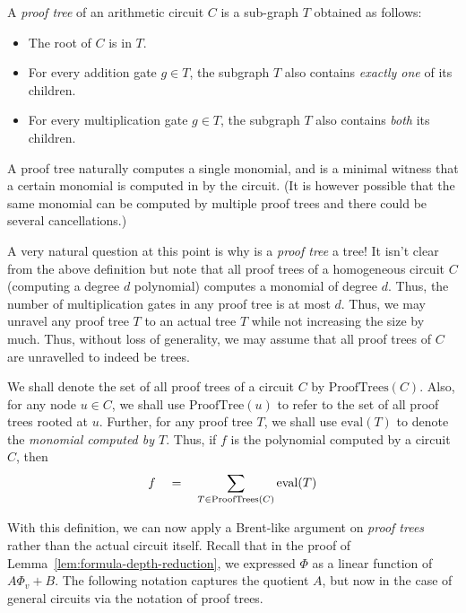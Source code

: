 \begin{definition}\label{defn:proof-tree}
A \emph{proof tree} of an arithmetic circuit $C$ is a sub-graph $T$ obtained as follows:
\begin{itemize}
\item The root of $C$ is in $T$.
\item For every addition gate $g\in T$, the subgraph $T$ also contains \emph{exactly one} of its children.
\item For every multiplication gate $g\in T$, the subgraph $T$ also contains \emph{both} its children. 
\end{itemize}
\end{definition}

A proof tree naturally computes a single monomial, and is a minimal witness that a certain monomial is computed in by the circuit. (It is however possible that the same monomial can be computed by multiple proof trees and there could be several cancellations.)

A very natural question at this point is why is a \emph{proof tree} a tree! It isn't clear from the above definition but note that all proof trees of a homogeneous circuit $C$ (computing a degree $d$ polynomial) computes a monomial of degree $d$. Thus, the number of multiplication gates in any proof tree is at most $d$. Thus, we may unravel any proof tree $T$ to an actual tree $T$ while not increasing the size by much. Thus, without loss of generality, we may assume that all proof trees of $C$ are unravelled to indeed be trees. 

We shall denote the set of all proof trees of a circuit $C$ by $\mathrm{ProofTrees}(C)$. Also, for any node $u\in C$, we shall use $\mathrm{ProofTree}(u)$ to refer to the set of all proof trees rooted at $u$. Further, for any proof tree $T$, we shall use $\mathrm{eval}(T)$ to denote  the  \emph{monomial computed by $T$}. Thus, if $f$ is the polynomial computed by a circuit $C$, then
\[
f\quad = \quad \sum_{T\in \mathrm{ProofTrees}(C)} \mathrm{eval}(T)
\]

With this definition, we can now apply a Brent-like argument on \emph{proof trees} rather than the actual circuit itself. Recall that in the proof of Lemma~\ref{lem:formula-depth-reduction}, we expressed $\Phi$ as a linear function of $A \Phi_v + B$. The following notation captures the quotient $A$, but now in the case of general circuits via the notation of proof trees. 

